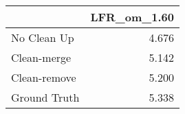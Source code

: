 \begin{tabular}{lr}
\toprule
{} & LFR_om_1.60 \\
\midrule
No Clean Up  &       4.676 \\
Clean-merge  &       5.142 \\
Clean-remove &       5.200 \\
Ground Truth &       5.338 \\
\bottomrule
\end{tabular}
